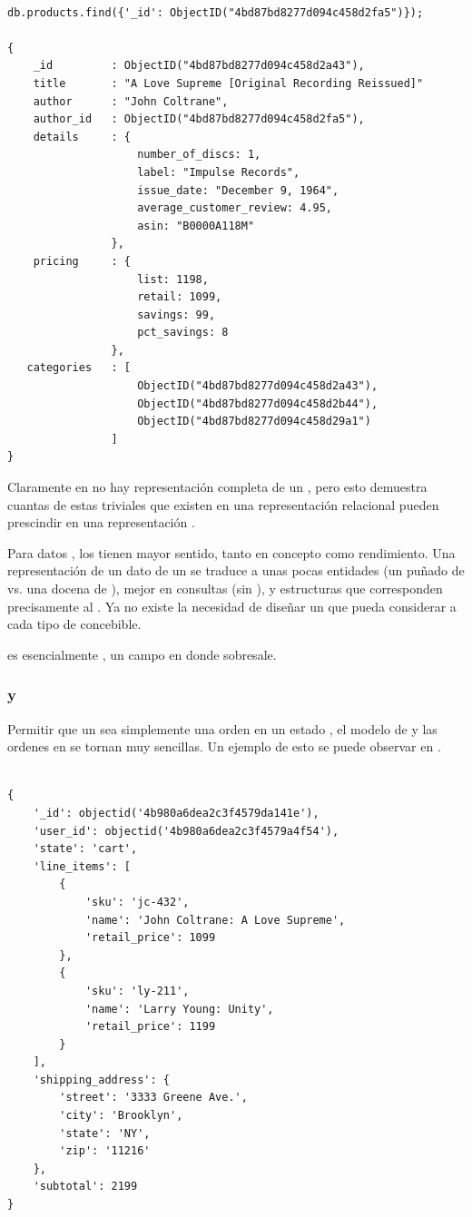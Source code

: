 \medskip
\begin{lstlisting}[caption= Busqueda en MongoDB, label=source:javascript:example_search_mongodb]

db.products.find({'_id': ObjectID("4bd87bd8277d094c458d2fa5")});

{
	_id			: ObjectID("4bd87bd8277d094c458d2a43"),
	title		: "A Love Supreme [Original Recording Reissued]"
	author		: "John Coltrane",
	author_id	: ObjectID("4bd87bd8277d094c458d2fa5"),
	details		: {
					number_of_discs: 1,
					label: "Impulse Records",
   					issue_date: "December 9, 1964",
   					average_customer_review: 4.95,
   					asin: "B0000A118M"
   				},
   	pricing		: {
   					list: 1198,
   					retail: 1099,
   					savings: 99,
   					pct_savings: 8
   				},
   categories	: [
   					ObjectID("4bd87bd8277d094c458d2a43"),
   					ObjectID("4bd87bd8277d094c458d2b44"), 
   					ObjectID("4bd87bd8277d094c458d29a1")
   				]
}
\end{lstlisting}

Claramente en  no hay  representación completa de un \itemCOM, pero esto demuestra cuantas de estas \tablesDB triviales que existen en una representación relacional pueden prescindir en una representación \documentDB.

Para datos \objectOrientedPL, los \documentsDB tienen mayor sentido, tanto en concepto como rendimiento. Una representación \documentOriented de un dato de un \itemCOM se traduce a unas pocas entidades (un puñado de \collectionsDB vs. una docena de \tablesDB), mejor \performanceQA en consultas (sin \serverSideAS \joins), y estructuras que corresponden precisamente al \itemCOM. Ya no existe la necesidad de diseñar un \masterSchema que pueda considerar a cada tipo de \itemCOM concebible.

\catalogManagement es esencialmente \contentManagement, un campo en donde \mongodbNAME sobresale.

\subsubsection{\shoppingCarts y \ordersCommerce}

Permitir que un \shoppingCarts sea simplemente una orden en un estado  \cartCOM, el modelo de \shoppingCarts y las ordenes en \mongodbNAME se tornan muy sencillas. Un ejemplo de esto se puede observar en  .

\medskip
\begin{lstlisting}[caption= Estructura de una \orderCommerce., label=source:javascript:example_schema_order]

{
	'_id': objectid('4b980a6dea2c3f4579da141e'),
	'user_id': objectid('4b980a6dea2c3f4579a4f54'),
	'state': 'cart',
	'line_items': [
		{
			'sku': 'jc-432',
			'name': 'John Coltrane: A Love Supreme',
			'retail_price': 1099
		},
		{
			'sku': 'ly-211',
			'name': 'Larry Young: Unity',
			'retail_price': 1199
		}
	],
	'shipping_address': {
		'street': '3333 Greene Ave.',
		'city': 'Brooklyn',
		'state': 'NY',
		'zip': '11216'
	},
	'subtotal': 2199
}
\end{lstlisting}

